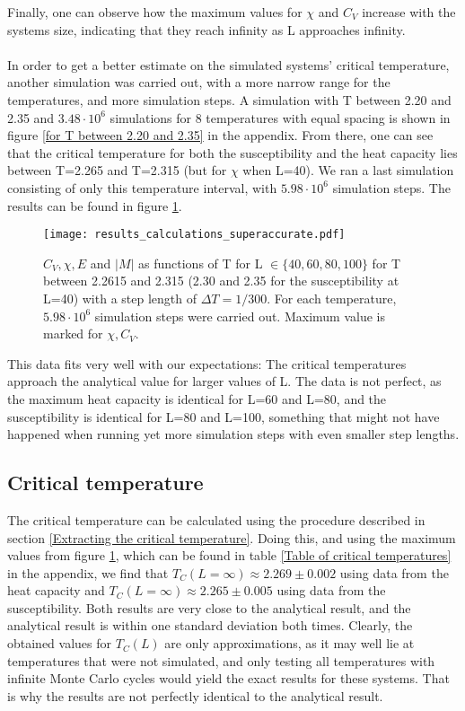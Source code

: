 \documentclass[10pt,a4paper]{article}
\begin{document}
Finally, one can observe how the maximum values for $\chi$ and $C_V$ increase with the systems size, indicating that they reach infinity as L approaches infinity.\\\\
In order to get a better estimate on the simulated systems' critical temperature, another simulation was carried out, with a more narrow range for the temperatures, and more simulation steps. A simulation with T between 2.20 and 2.35 and $3.48\cdot10^6$ simulations for 8 temperatures with equal spacing is shown in figure \ref{for T between 2.20 and 2.35} in the appendix. From there, one can see that the critical temperature for both the susceptibility and the heat capacity lies between T=2.265 and T=2.315 (but for $\chi$ when L=40). We ran a last simulation consisting of only this temperature interval, with $5.98\cdot10^6$ simulation steps. The results can be found in figure \ref{Superaccurate critical temperature plot}. 
\begin{figure}[H]
\texttt{[image: results\_calculations\_superaccurate.pdf]}
\caption[$C_V,\chi,E, |M|$ for T between 2.2615 and 2.315]{$C_V,\chi,E$ and $|M|$ as functions of T for  L $ \in \{40,60,80,100\}$ for T between 2.2615 and 2.315 (2.30 and 2.35 for the susceptibility at L=40) with a step length of $\Delta T=1/300$. For each temperature, $5.98\cdot10^6$ simulation steps were carried out. Maximum value is marked for $\chi,C_V$.}\label{Superaccurate critical temperature plot}
\end{figure}
This data fits very well with our expectations: The critical temperatures approach the analytical value for larger values of L. The data is not perfect, as the maximum heat capacity is identical for L=60 and L=80, and the susceptibility is identical for L=80 and L=100, something that might not have happened when running yet more simulation steps with even smaller step lengths. 
\subsection{Critical temperature}
The critical temperature can be calculated using the procedure described in section \ref{Extracting the critical temperature}. Doing this, and using the maximum values from figure \ref{Superaccurate critical temperature plot}, which can be found in table \ref{Table of critical temperatures} in the appendix, we find that $T_C(L=\infty)\approx2.269\pm0.002$ using data from the heat capacity and  $T_C(L=\infty)\approx2.265\pm0.005$ using data from the susceptibility. Both results are very close to the analytical result, and the analytical result is within one standard deviation both times. Clearly, the obtained values for $T_C(L)$ are only approximations, as it may well lie at temperatures that were not simulated, and only testing all temperatures with infinite Monte Carlo cycles would yield the exact results for these systems. That is why the results are not perfectly identical to the analytical result.
\end{document}

